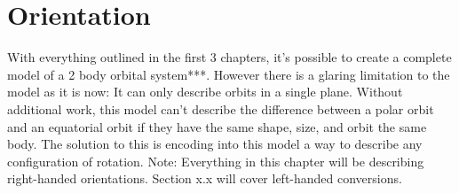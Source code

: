 \chapter{Orientation}
With everything outlined in the first 3 chapters, it's possible to create a complete model of a 2 body orbital system***. However there is a glaring limitation to the model as it is now: It can only describe orbits in a single plane. Without additional work, this model can't describe the difference between a polar orbit and an equatorial orbit if they have the same shape, size, and orbit the same body. The solution to this is encoding into this model a way to describe any configuration of rotation. Note: Everything in this chapter will be describing right-handed orientations. Section x.x will cover left-handed conversions.


\newpage


\newpage